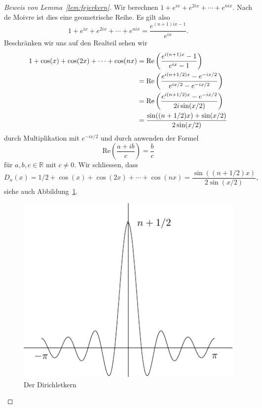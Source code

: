 \documentclass[../main.tex]{subfiles}
\begin{document}
\begin{proof}[Beweis von Lemma~\ref{lem:fejerkern}]
  Wir berechnen
  \(
    1 + e^{ix} + e^{2ix} + \cdots + e^{nix}.
  \)
  Nach de Moivre ist dies eine geometrische Reihe.
  Es gilt also
  \[
    1 + e^{ix} + e^{2ix} + \cdots + e^{nix} = \frac{e^{(n+1)ix - 1}}{e^{ix}}.
  \]
  Beschränken wir uns auf den Realteil sehen wir
  \begin{align*}
    1 + \cos(x) + \cos(2x) + \cdots + \cos(nx) 
    &=
    \textup{Re} \left( \frac{e^{i(n+1)x} - 1}{e^{ix} - 1} \right)\\
    &
    = \textup{Re} \left( \frac{e^{i(n + 1/2)x} - e^{-ix/2}}{e^{ix/2} - e^{-ix/2}} \right)\\
    &
    = \textup{Re} \left( \frac{e^{i(n + 1/2)x} - e^{-ix/2}}{2i \sin(x/2)} \right)\\
    &= \frac{\sin((n+1/2)x) + \sin(x/2)}{2 \sin(x/2)}
  \end{align*}
  durch Multiplikation mit $e^{-ix/2}$ und durch anwenden der Formel
  \[
    \text{Re}\left( \frac{a + ib}{c} \right) = \frac{b}{c}
  \]
  für $a, b, c \in \mathbb{R}$ mit $c \neq 0$.
  Wir schliessen, dass
  \[
    D_n(x) = 1/2 + \cos(x) + \cos(2x) + \cdots + \cos(nx)
    = \frac{\sin((n+ 1/2)x)}{2 \sin(x/2)},
  \]
  siehe auch Abbildung~\ref{fig:dirichlet}.

  \begin{figure}[htb]
    \centering
    \includegraphics{images/dirichlet}
    \caption{Der Dirichletkern}%
    \label{fig:dirichlet}
  \end{figure}
  

\end{proof}
\end{document}
